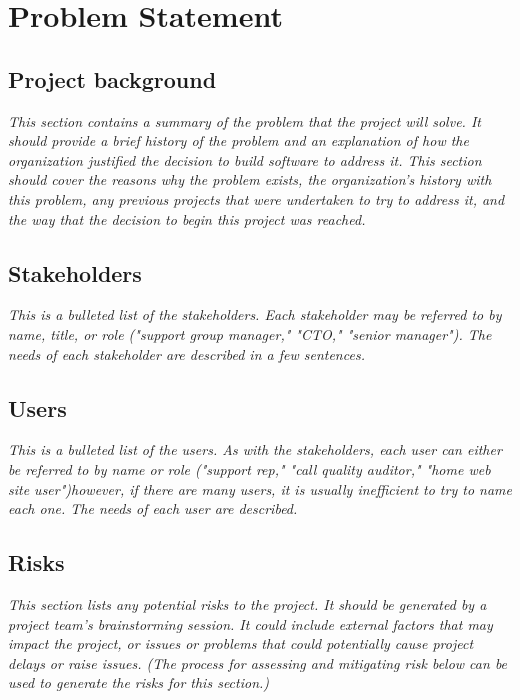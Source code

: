 \documentclass[12pt]{article}
\begin{document}

\section{Problem Statement}
\subsection{Project background}

    \textit{This section contains a summary of the problem that the project
    will solve. It should provide a brief history of the problem and
    an explanation of how the organization justified the decision to
    build software to address it. This section should cover the
    reasons why the problem exists, the organization's history with
    this problem, any previous projects that were undertaken to try to
    address it, and the way that the decision to begin this project
    was reached.}

\subsection{Stakeholders}

    \textit{This is a bulleted list of the stakeholders. Each stakeholder may
    be referred to by name, title, or role ("support group manager,"
    "CTO," "senior manager"). The needs of each stakeholder are
    described in a few sentences.}

\subsection{Users}

    \textit{This is a bulleted list of the users. As with the stakeholders,
    each user can either be referred to by name or role ("support
    rep," "call quality auditor," "home web site user")however, if
    there are many users, it is usually inefficient to try to name
    each one. The needs of each user are described.}

\subsection{Risks}

    \textit{This section lists any potential risks to the project. It should
    be generated by a project team's brainstorming session. It could
    include external factors that may impact the project, or issues or
    problems that could potentially cause project delays or raise
    issues. (The process for assessing and mitigating risk below can
    be used to generate the risks for this section.)}
\end{document}
